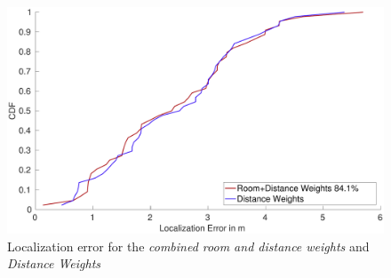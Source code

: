 \begin{figure}
\centering
\includegraphics[width=\textwidth]{Figures/WeightingCDF_realDistance}
\decoRule
\caption[CDF Room+Distance Weights - comparison against Distance Weights]{Localization error for the \emph{combined room and distance weights} and \emph{Distance Weights}}
\label{fig:WeightingCDFrealDistance}
\end{figure}
